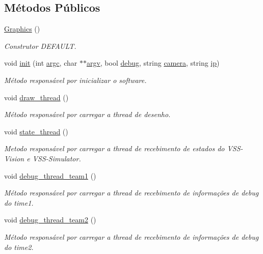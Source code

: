 \subsection*{Métodos Públicos}
\begin{DoxyCompactItemize}
\item 
\hyperlink{classGraphics_af2e8fe67fd31ec263c843a6e28b29d3c}{Graphics} ()
\begin{DoxyCompactList}\small\item\em Construtor D\+E\+F\+A\+U\+LT. \end{DoxyCompactList}\item 
void \hyperlink{classGraphics_aa1cd9918be0133bb6cf59de07ee211f8}{init} (int \hyperlink{classGraphics_a1b1e8eba7ed4e60d78d785e70765fef6}{argc}, char $\ast$$\ast$\hyperlink{classGraphics_aca7bf0128e62af000265c0e66ed5e7e1}{argv}, bool \hyperlink{classGraphics_a16b588a2b580e104d18c347f8318e3bd}{debug}, string \hyperlink{classGraphics_acb397e43edd9c7d6de193bbb9ff55b94}{camera}, string \hyperlink{classGraphics_ad5daf3bff501ac78b1507a8df1534423}{ip})
\begin{DoxyCompactList}\small\item\em Método responsável por inicializar o software. \end{DoxyCompactList}\item 
void \hyperlink{classGraphics_a5c2dc0d8c33e87def636d4edce50f4a5}{draw\+\_\+thread} ()
\begin{DoxyCompactList}\small\item\em Método responsável por carregar a thread de desenho. \end{DoxyCompactList}\item 
void \hyperlink{classGraphics_a6429fd2fc5fa7a3c5a56b9987e13afdb}{state\+\_\+thread} ()
\begin{DoxyCompactList}\small\item\em Metodo responsável por carregar a thread de recebimento de estados do V\+S\+S-\/\+Vision e V\+S\+S-\/\+Simulator. \end{DoxyCompactList}\item 
void \hyperlink{classGraphics_af5bddf0e5aecdf97e779efa677b2179b}{debug\+\_\+thread\+\_\+team1} ()
\begin{DoxyCompactList}\small\item\em Método responsável por carregar a thread de recebimento de informações de debug do time1. \end{DoxyCompactList}\item 
void \hyperlink{classGraphics_aee35712f5483009df689c313df804f52}{debug\+\_\+thread\+\_\+team2} ()
\begin{DoxyCompactList}\small\item\em Método responsável por carregar a thread de recebimento de informações de debug do time2. \end{DoxyCompactList}\end{DoxyCompactItemize}
